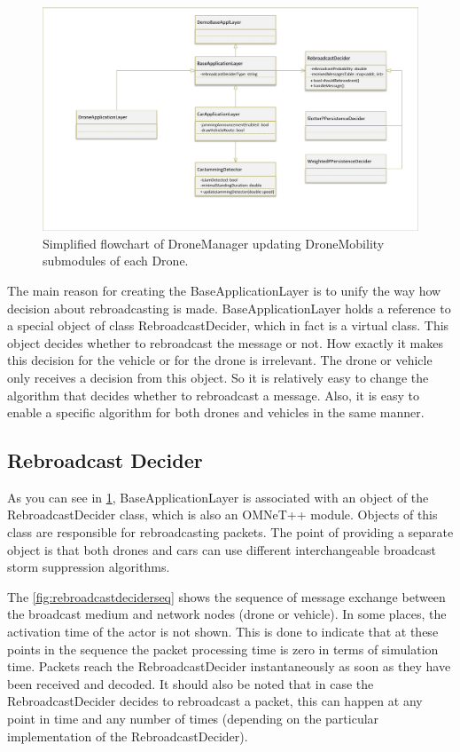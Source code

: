 \documentclass[]{nsm-thesis}
\begin{document}
\begin{figure}
	\centering
	\includegraphics[width=1\textwidth]{figures/BaseApplicationLayer.pdf}
	\caption{Simplified flowchart of DroneManager updating DroneMobility submodules of each Drone.}
	\label{fig:baseapplicationlayer}
\end{figure}

The main reason for creating the BaseApplicationLayer is to unify the way how decision about rebroadcasting is made. BaseApplicationLayer holds a reference to a special object of class RebroadcastDecider, which in fact is a virtual class. This object decides whether to rebroadcast the message or not. How exactly it makes this decision for the vehicle or for the drone is irrelevant. The drone or vehicle only receives a decision from this object. So it is relatively easy to change the algorithm that decides whether to rebroadcast a message. Also, it is easy to enable a specific algorithm for both drones and vehicles in the same manner.



\subsection {Rebroadcast Decider}

As you can see in \cref{fig:baseapplicationlayer}, BaseApplicationLayer is associated with an object of the RebroadcastDecider class, which is also an OMNeT++ module. Objects of this class are responsible for rebroadcasting packets. The point of providing a separate object is that both drones and cars can use different interchangeable broadcast storm suppression algorithms. 

The \cref{fig:rebroadcastdeciderseq} shows the sequence of message exchange between the broadcast medium and network nodes (drone or vehicle). In some places, the activation time of the actor is not shown. This is done to indicate that at these points in the sequence the packet processing time is zero in terms of simulation time. Packets reach the RebroadcastDecider instantaneously as soon as they have been received and decoded. It should also be noted that in case the RebroadcastDecider decides to rebroadcast a packet, this can happen at any point in time and any number of times (depending on the particular implementation of the RebroadcastDecider).
\end{document}
